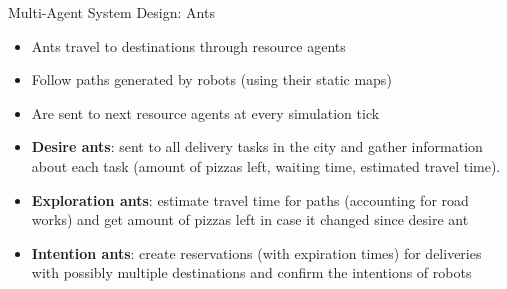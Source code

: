 \begin{frame}{Multi-Agent System Design: Ants}
    \begin{itemize}
        \item Ants travel to destinations through resource agents
        \item Follow paths generated by robots (using their static maps)
        \item Are sent to next resource agents at every simulation tick
    \end{itemize}

    \begin{itemize}
        \item \textbf{Desire ants}: sent to all delivery tasks in the city and gather information about each task (amount of pizzas left, waiting time, estimated travel time).
        \item \textbf{Exploration ants}: estimate travel time for paths (accounting for road works) and get amount of pizzas left in case it changed since desire ant
        \item \textbf{Intention ants}: create reservations (with expiration times) for deliveries with possibly multiple destinations and confirm the intentions of robots
    \end{itemize}
\end{frame}

